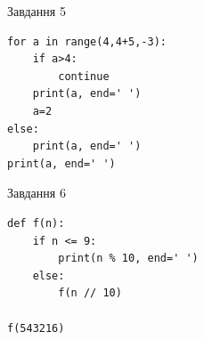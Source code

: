 \documentclass[12pt, ukrainian]{article}
\begin{document}
{\vspace{15mm}
\begin{minipage}[t]{9.7cm}                
{\begin{center}Завдання {5}\end{center}}
\begin{verbatim}
for a in range(4,4+5,-3):
    if a>4:
        continue
    print(a, end=' ')
    a=2
else:
    print(a, end=' ')
print(a, end=' ')
\end{verbatim}     
\end{minipage}
\vline \hspace{8mm}
\begin{minipage}[t]{8.0cm}                
{\begin{center}Завдання {6}\end{center}}
\begin{verbatim}
def f(n):
    if n <= 9:
        print(n % 10, end=' ')
    else:
        f(n // 10)

f(543216)
\end{verbatim}     
\end{minipage}

}
\newpage
\end{document}
